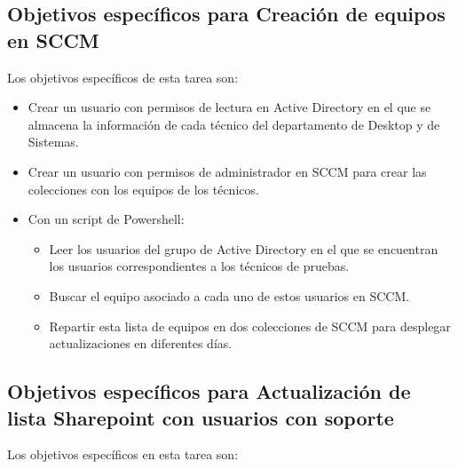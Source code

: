 \documentclass[a4paper, 12pt]{book}
\begin{document}
\subsection{Objetivos específicos para Creación de equipos en SCCM}
\label{Objetivos específicos para Creación de equipos en SCCM}

Los objetivos específicos de esta tarea son:

\begin{itemize}
\item Crear un usuario con permisos de lectura en Active Directory en el que se almacena la información de cada técnico del departamento de Desktop y de Sistemas.

\item Crear un usuario con permisos de administrador en SCCM para crear las colecciones con los equipos de los técnicos.

\item Con un script de Powershell:

	\begin{itemize}
		\item Leer los usuarios del grupo de Active Directory en el que se encuentran los usuarios correspondientes a los técnicos de pruebas.
		
		\item Buscar el equipo asociado a cada uno de estos usuarios en SCCM.
		
		\item Repartir esta lista de equipos en dos colecciones de SCCM para desplegar actualizaciones en diferentes días.
	\end{itemize}
\end{itemize}


\subsection{Objetivos específicos para Actualización de lista Sharepoint con usuarios con soporte}
\label{Objetivos específicos para Actualización de lista Sharepoint con usuarios con soporte}

Los objetivos específicos en esta tarea son:
\end{document}
